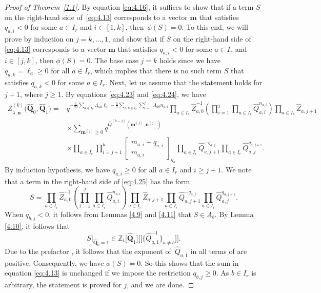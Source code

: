 \documentclass[pdftex]{sigma}
\numberwithin{equation}{section}
\begin{document}
\begin{proof}[Proof of Theorem~\ref{1.1}]
By equation \eqref{eq:4.16}, it suffices to show that if a term $S$ on the right-hand side of~\eqref{eq:4.13} corresponds to a vector $\mathbf{m}$ that satisfies $q_{a,i}<0$ for some $a\in I_r$ and $i\in[1,k]$, then~${\phi(S)=0}$. To this end, we will prove by induction on $j=k,\dots,1$, and show that if $S$ on the right-hand side of \eqref{eq:4.13} corresponds to a vector $\mathbf{m}$ that satisfies $q_{a,i}<0$ for some $a\in I_r$ and~${i\in[j,k]}$, then $\phi(S)=0$. The base case $j=k$ holds since we have $q_{a,k}=\ell_a\geq0$ for all $a\in I_r$, which implies that there is no such term $S$ that satisfies $q_{a,k}<0$ for some $a\in I_r$. Next, let us assume that the statement holds for $j+1$, where $j\geq1$. By equations \eqref{eq:4.23} and \eqref{eq:4.24}, we have
\begin{align}\label{eq:4.25}
Z_{\overline{\lambda},\mathbf{n}}^{(k)}\bigl(\widehat{\mathbf{Q}}_0,\widehat{\mathbf{Q}}_1\bigr)
={}&q^{-\frac{1}{2\delta}\sum_{a\in I_r}\Lambda_{aa}\ell_a-\frac{1}{\delta}\sum_{a,b\in I_r}\sum_{i=1}^j\Lambda_{ab}n_{a,i}}\prod_{a\in I_r}\widehat{Z}_{a,0}^{-1}\left(\prod_{i=1}^j\prod_{a\in I_r}\widehat{Q}_{a,i}^{n_{a,i}}\right)\prod_{a\in I_r}\widehat{Z}_{a,j+1}\nonumber\\
&\times\sum_{\mathbf{m}^{(j)}\geq0}q^{\overline{Q}^{(k-j)}(\mathbf{m}^{(j)},\mathbf{n}^{(j)})}\nonumber\\
&\times\prod_{a\in I_r}\prod_{i=j+1}^k\begin{bmatrix}m_{a,i}+q_{a,i}\\m_{a,i}\end{bmatrix}_{q_a}\prod_{a\in I_r}\widehat{Q}_{a,j+1}^{-q_{a,j}}\prod_{a\in I_r}\widehat{Q}_{a,j}^{q_{a,j+1}}.
\end{align}
By induction hypothesis, we have $q_{a,i}\geq0$ for all $a\in I_r$ and $i\geq j+1$. We note that a term in the right-hand side of \eqref{eq:4.25} has the form
\begin{equation*}
S
=\prod_{a\in I_r}\widehat{Z}_{a,0}^{-1}\left(\prod_{i=1}^j\prod_{a\in I_r}\widehat{Q}_{a,i}^{n_{a,i}}\right)\prod_{a\in I_r}\widehat{Z}_{a,j+1}\prod_{a\in I_r}\widehat{Q}_{a,j+1}^{-q_{a,j}}\prod_{a\in I_r}\widehat{Q}_{a,j}^{q_{a,j+1}}.
\end{equation*}
When $q_{b,j}<0$, it follows from Lemmas \ref{4.9} and \ref{4.11} that $S\in A_b$. By Lemma \ref{4.10}, it follows that
\[
S|_{\widehat{\mathbf{Q}}_0=1}\in\mathbb{Z}_t\bigl[\widehat{\mathbf{Q}}_1\bigr]\bigl[\bigl[\bigl\{\widehat{Q}_{a,1}^{-1}\bigr\}_{a\neq b}\bigr]\bigr].
\]
 Due to the prefactor , it follows that the exponent of~$\widehat{Q}_{a,1}$ in all terms of  are positive. Consequently, we have $\phi(S)=0$. So this shows that the sum in equation \eqref{eq:4.13} is unchanged if we impose the restriction $q_{b,j}\geq0$. As $b\in I_r$ is arbitrary, the statement is proved for $j$, and we are done.
\end{proof}
\end{document}
